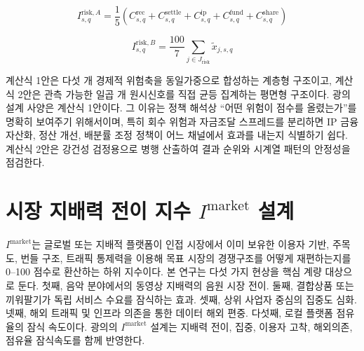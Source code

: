 \documentclass[11pt,a4paper]{report}
\begin{document}
\begin{equation}
\label{eq:irisk_hierarchical}
I^{\mathrm{risk},A}_{s,q} = \frac{1}{5}\left(C^{\mathrm{rec}}_{s,q}+C^{\mathrm{settle}}_{s,q}+C^{\mathrm{ip}}_{s,q}+C^{\mathrm{fund}}_{s,q}+C^{\mathrm{share}}_{s,q}\right)
\end{equation}

\begin{equation}
\label{eq:irisk_flat}
I^{\mathrm{risk},B}_{s,q} = \frac{100}{7}\sum_{j \in J_{\mathrm{risk}}}\widetilde{x}_{j,s,q}
\end{equation}

계산식 1안은 다섯 개 경제적 위험축을 동일가중으로 합성하는 계층형 구조이고, 계산식 2안은 관측 가능한 일곱 개 원시신호를 직접 균등 집계하는 평면형 구조이다. 광의 설계 사양은 계산식 1안이다. 그 이유는 정책 해석상 ``어떤 위험이 점수를 올렸는가''를 명확히 보여주기 위해서이며, 특히 회수 위험과 자금조달 스프레드를 분리하면 IP 금융 자산화, 정산 개선, 배분률 조정 정책이 어느 채널에서 효과를 내는지 식별하기 쉽다. 계산식 2안은 강건성 검정용으로 병행 산출하여 결과 순위와 시계열 패턴의 안정성을 점검한다.

\section{\texorpdfstring{시장 지배력 전이 지수 $I^{\mathrm{market}}$ 설계}{시장 지배력 전이 지수 Imarket 설계}}
$I^{\mathrm{market}}$는 글로벌 또는 지배적 플랫폼이 인접 시장에서 이미 보유한 이용자 기반, 주목도, 번들 구조, 트래픽 통제력을 이용해 목표 시장의 경쟁구조를 어떻게 재편하는지를 0--100 점수로 환산하는 하위 지수이다. 본 연구는 다섯 가지 현상을 핵심 계량 대상으로 둔다. 첫째, 음악 분야에서의 동영상 지배력의 음원 시장 전이. 둘째, 결합상품 또는 끼워팔기가 독립 서비스 수요를 잠식하는 효과. 셋째, 상위 사업자 중심의 집중도 심화. 넷째, 해외 트래픽 및 인프라 의존을 통한 데이터 해외 편중. 다섯째, 로컬 플랫폼 점유율의 잠식 속도이다. 광의의 $I^{\mathrm{market}}$ 설계는 지배력 전이, 집중, 이용자 고착, 해외의존, 점유율 잠식속도를 함께 반영한다.
\end{document}
